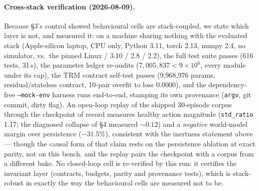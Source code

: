 \documentclass[10pt,letterpaper]{article}
\begin{document}
\paragraph{Cross-stack verification (2026-08-09).} Because \S3's control
showed behavioural cells are stack-coupled, we state which layer is not, and
measured it: on a machine sharing nothing with the evaluated stack
(Apple-silicon laptop, CPU only, Python 3.11, torch 2.13, numpy 2.4, no
simulator, vs.\ the pinned Linux / 3.10 / 2.8 / 2.2), the full test suite
passes (616 tests, 31\,s), the parameter ledger re-audits
($7{,}005{,}837 < 9{\times}10^6$, every module under its cap), the TRM
contract self-test passes (9{,}968{,}976 params, residual/stateless contract,
10-pair overfit to loss 0.0000), and the dependency-free \texttt{--mock-env}
harness runs end-to-end, stamping its own provenance (\texttt{argv}, git
commit, dirty flag). An open-loop replay of the shipped 30-episode corpus
through the checkpoint of record measures healthy action magnitude
(\texttt{std\_ratio} 1.17; the diagnosed collapse of \S4 measured ${\sim}0.12$)
and a \emph{negative} world-model margin over persistence ($-31.5\%$),
consistent with the inertness statement above --- though the causal form of
that claim rests on the persistence ablation at exact parity, not on this
bench, and the replay pairs the checkpoint with a corpus from a different
bake. No closed-loop cell is re-verified by this run: it certifies the
invariant layer (contracts, budgets, parity and provenance tests), which is
stack-robust in exactly the way the behavioural cells are measured not to be.



\end{document}
